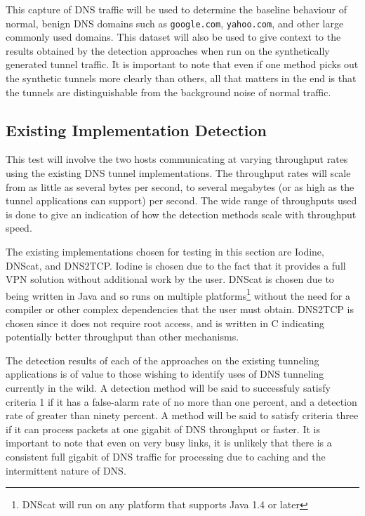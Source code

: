 \documentclass[12pt]{report}
\theoremstyle{remark}
\theoremstyle{definition}
\theoremstyle{definition}
\theoremstyle{definition}
\begin{document}
This capture of DNS traffic will be used to determine the baseline behaviour of
normal, benign DNS domains such as \texttt{google.com}, \texttt{yahoo.com}, and
other large commonly used domains. This dataset will also be used to give
context to the results obtained by the detection approaches when run on the
synthetically generated tunnel traffic. It is important to note that even if one
method picks out the synthetic tunnels more clearly than others, all that
matters in the end is that the tunnels are distinguishable from the background
noise of normal traffic.

\subsection{Existing Implementation Detection}
\label{test-existing}
This test
will involve the two hosts communicating at varying throughput rates using the
existing DNS tunnel implementations. The throughput rates will scale from as
little as several bytes per second, to several megabytes (or as high as the
tunnel applications can support) per second. The wide range of throughputs used
is done to give an indication of how the detection methods scale with throughput
speed.

The existing implementations chosen for testing in this section are
Iodine\cite{iodinesrc}, DNScat\cite{dnscatsrc}, and DNS2TCP\cite{dns2tcpsrc}.
Iodine is chosen due to the fact that it provides a full VPN solution without
additional work by the user. DNScat is chosen due to being written in Java and
so runs on multiple platforms\footnote{DNScat will run on any platform that
supports Java 1.4 or later\cite{dnscatsrc}} without the need for a compiler or
other complex dependencies that the user must obtain. DNS2TCP is chosen since it
does not require root access, and is written in C indicating potentially better
throughput than other mechanisms.

The detection results of each of the approaches on the existing tunneling
applications is of value to those wishing to identify uses of DNS tunneling
currently in the wild. A detection method will be said to successfuly satisfy
criteria 1 if it has a false-alarm rate of no more than one percent, and a
detection rate of greater than ninety percent. A method will be said to satisfy
criteria three if it can process packets at one gigabit of DNS throughput or
faster. It is important to note that even on very busy links, it is unlikely
that there is a consistent full gigabit of DNS traffic for processing due to
caching and the intermittent nature of DNS.
\end{document}

